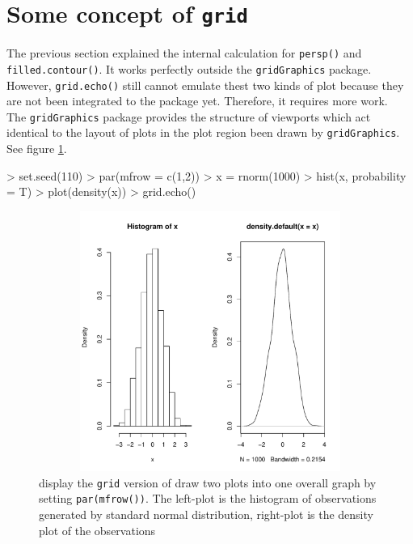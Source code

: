 \documentclass[paper=a4, fontsize=11pt]{report}
\begin{document}
\section{Some concept of \texttt{grid}}
The previous section explained the internal calculation for \texttt{persp()} and \texttt{filled.contour()}. It works perfectly outside the \texttt{gridGraphics} package. However, \texttt{grid.echo()} still cannot emulate thest two kinds of plot because they are not been integrated to the package yet. Therefore, it requires more work.\\ 
The \texttt{gridGraphics} package provides the structure of viewports which act identical to the layout of plots in the plot region been drawn by \texttt{gridGraphics}. See figure \ref{figure_4.1}.
\begin{Schunk}
\begin{Sinput}
> set.seed(110)
> par(mfrow = c(1,2))
> x = rnorm(1000)
> hist(x, probability = T)
> plot(density(x))
> grid.echo()
\end{Sinput}
\end{Schunk}
\begin{figure}[h]
	\begin{center}
		\includegraphics[height = 8.5cm, width = 15cm]{figure/viewport_demo_1.pdf}
		\caption{display the \texttt{grid} version of draw two plots into one overall graph by setting \texttt{par(mfrow())}. The left-plot is the histogram of observations generated by standard normal distribution, right-plot is the density plot of the observations}
		\label{figure_4.1}
	\end{center}
\end{figure}
\end{document}
